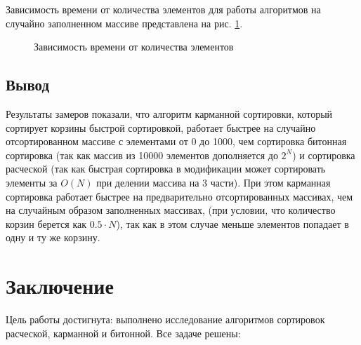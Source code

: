 \documentclass[12pt]{report}
\begin{document}
	Зависимость времени от количества элементов для работы алгоритмов на случайно заполненном массиве представлена на рис. \ref{ris4}.
	
	\begin{center}
		\begin{figure}[H]
		\center
		\caption{Зависимость времени от количества элементов}
		\label{ris4}
		\end{figure}
	\end{center}
	

	\section*{Вывод}
	
	Результаты замеров показали, что алгоритм карманной сортировки, который сортирует корзины быстрой сортировкой, работает быстрее на случайно отсортированном массиве с элементами от 0 до 1000, чем сортировка битонная сортировка  (так как массив из 10000 элементов дополняется до $2^N$) и сортировка расческой (так как быстрая сортировка в модификации может сортировать элементы за $O(N)$ при делении массива на 3 части). При этом карманная сортировка работает быстрее на предварительно отсортированных массивах, чем на случайным образом заполненных массивах, (при условии, что количество корзин берется как $0.5 \cdot N$), так как в этом случае меньше элементов попадает в одну и ту же корзину. 
	
	\chapter*{Заключение}
	
	Цель работы достигнута: выполнено исследование алгоритмов сортировок расческой, карманной и битонной. Все задаче решены:
	
\end{document}

